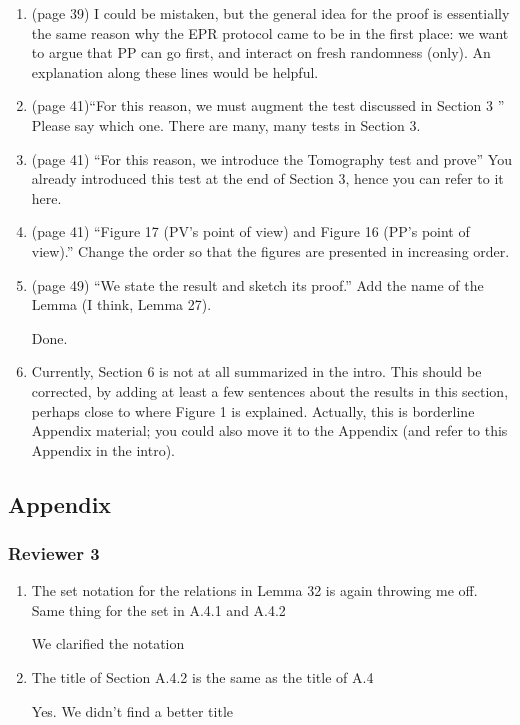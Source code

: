 \documentclass[12pt]{article}
\newcommand{\EPR}{{\sf EPR }}
\begin{document}
\begin{enumerate}
\item (page 39)
      I could be mistaken, but the general idea for the proof is essentially the same reason why the \EPR protocol came to be in the first place: we want to argue that PP can go first, and interact on fresh randomness (only). An explanation along these lines would be helpful.

\item (page 41)``For this reason, we must
augment the test discussed in Section 3 '' Please say which one. There are many, many tests in Section 3.
\item (page 41) ``For this reason, we introduce the Tomography test and prove'' You already introduced this test at the end of Section 3, hence you can refer to it here.
\item (page 41) ``Figure 17 (PV’s point of view)
and Figure 16 (PP’s point of view).'' Change the order so that the figures are presented in increasing order.
\item (page 49) ``We state the result and sketch its proof.'' Add the name of the Lemma (I think, Lemma 27).

{\color{blue} Done.}

\item Currently, Section 6 is not at all summarized in the intro. This should be corrected, by adding at least a few sentences about the results in this section, perhaps close to where Figure 1 is explained. Actually, this is borderline Appendix material; you could also move it to the Appendix (and refer to this Appendix in the intro).
\end{enumerate}


\subsection*{Appendix}
\subsubsection*{Reviewer 3}
\begin{enumerate}
\item The set notation for the relations in Lemma 32 is again throwing me off. Same thing for the set in A.4.1 and A.4.2

{\color{blue} We clarified the notation} 

\item The title of Section A.4.2 is the same as the title of A.4

{\color{blue} Yes. We didn't find a better title} 

\end{enumerate}
\end{document}
